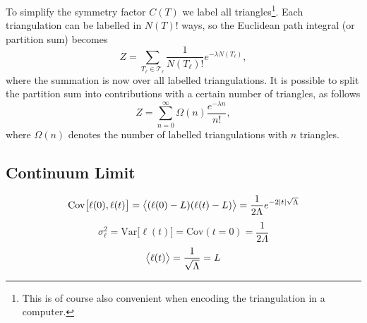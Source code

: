 To simplify the symmetry factor $C(T)$ we label all triangles\footnote{This is of course also convenient when encoding the triangulation in a computer.}. Each triangulation can be labelled in $N(T)!$ ways, so the Euclidean path integral (or partition sum) becomes
\begin{equation}
    Z
    =
    \sum_{T_\ell \in \mathcal{T}_\ell} \frac{1}{N(T_\ell)!} e^{- \lambda N(T_\ell)}
    ,
\end{equation}
where the summation is now over all labelled triangulations. It is possible to split the partition sum into contributions with a certain number of triangles, as follows
\begin{equation}\label{eq:part_sum}
    Z
    =
    \sum_{n = 0}^\infty \Omega(n) \frac{e^{- \lambda n}}{n!}
    ,
\end{equation}
where $\Omega(n)$ denotes the number of labelled triangulations with $n$ triangles.

\subsection{Continuum Limit}
\begin{equation}\label{eq:cov_ell}
    \text{Cov}\big[\ell(0), \ell(t)\big] = \big\langle \qty(\ell(0) - L)\qty(\ell(t) - L) \big\rangle
    = \frac{1}{2\Lambda} e^{- 2\abs{t}\sqrt{\Lambda}}
\end{equation}
\begin{equation}\label{eq:std_ell}
    \sigma_\ell^2 = \text{Var}\big[\ell(t)\big] = \text{Cov}(t = 0)
    = \frac{1}{2\Lambda}
\end{equation}
\begin{equation}\label{eq:exp_ell}
    \big\langle \ell(t) \big\rangle = \frac{1}{\sqrt{\Lambda}} = L
\end{equation}


